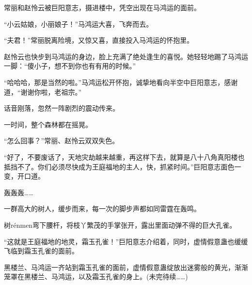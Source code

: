 \begin{this_body}
常丽和赵怜云被巨阳意志，摄进楼中，凭空出现在马鸿运的面前。

“小云姑娘，小丽娘子！”马鸿运大喜，飞奔而去。

“夫君！”常丽脱离险境，又惊又喜，直接投入马鸿运的怀抱里。

赵怜云也快步到马鸿运的身边，脸上充满了绝处逢生的喜悦。她轻轻地踢了马鸿运一脚：“傻小子，想不到你也有有用的时候。”

“哈哈哈，那是当然的啦。”马鸿运松开怀抱，诚挚地看向半空中巨阳意志，感谢道，“谢谢你啦，老祖宗。”

话音刚落，忽然一阵剧烈的震动传来。

一时间，整个森林都在摇晃。

“怎么回事？”常丽、赵怜云双双失色。

“好了，不要废话了，天地灾劫越来越重，再这样下去，就算是八十八角真阳楼也抵挡不了。你们必须尽快成为王庭福地的主人，快，抓紧时间。”巨阳意志面色一变，开口道。

轰轰轰……

一群高大的树人，缓步而来，每一次的脚步声都如同雷霆在轰鸣。

树rénmen弯下腰杆，将枝丫繁茂的手掌张开，露出里面动弹不得的巨大孔雀。

“这就是王庭福地的地灵，霜玉孔雀！”巨阳意志介绍着，同时，虚情假意蛊也缓缓飞临到霜玉孔雀的面前。

黑楼兰、马鸿运一齐站到霜玉孔雀的面前，虚情假意蛊绽放出迷雾般的黄光，渐渐笼罩在黑楼兰、马鸿运，以及霜玉孔雀的身上。(未完待续……)

\end{this_body}

